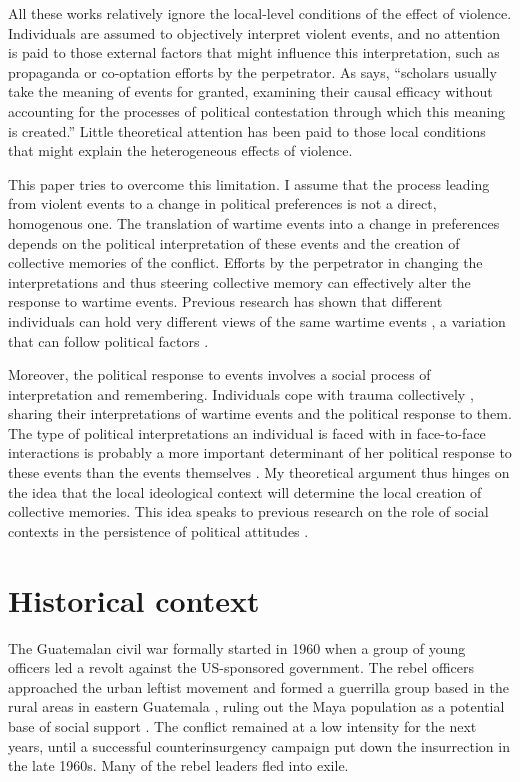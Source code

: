 \documentclass[12pt, notitlepage]{article}
\begin{document}
All these works relatively ignore the local-level conditions of the effect of violence.
Individuals are assumed to objectively interpret violent events, and no attention is paid to those external factors that might influence this interpretation, such as propaganda or co-optation efforts by the perpetrator.
As \citet[1244]{Basta:2018aa} says, ``scholars usually take the meaning of events for granted, examining their causal efficacy without accounting for the processes of political contestation through which this meaning is created.''
Little theoretical attention has been paid to those local conditions that might explain the heterogeneous effects of violence.

This paper tries to overcome this limitation.
I assume that the process leading from violent events to a change in political preferences is not a direct, homogenous one.
The translation of wartime events into a change in preferences depends on the political interpretation of these events and the creation of collective memories of the conflict.
Efforts by the perpetrator in changing the interpretations and thus steering collective memory can effectively alter the response to wartime events.
Previous research has shown that different individuals can hold very different views of the same wartime events \citep{Driscoll:2016aa}, a variation that can follow political factors \citep{Silverman:2019aa}.

Moreover, the political response to events involves a social process of interpretation and remembering.
Individuals cope with trauma collectively \citep{Lyons:1998aa}, sharing their interpretations of wartime events and the political response to them.
The type of political interpretations an individual is faced with in face-to-face interactions is probably a more important determinant of her political response to these events than the events themselves \citep{Dyrstad:2012aa, Molina:2014aa, Glaurdic:2016aa}.
My theoretical argument thus hinges on the idea that the local ideological context will determine the local creation of collective memories.
This idea speaks to previous research on the role of social contexts in the persistence of political attitudes \citep{Wittenberg:2006aa, Tavits:2013aa}.

\section*{Historical context}

The Guatemalan civil war formally started in 1960 when a group of young officers led a revolt against the US-sponsored government.
The rebel officers approached the urban leftist movement and formed a guerrilla group based in the rural areas in eastern Guatemala \citep{Arias:1992aa}, ruling out the Maya population as a potential base of social support \citep{Smith:1990ab}.
The conflict remained at a low intensity for the next years, until a successful counterinsurgency campaign put down the insurrection in the late 1960s.
Many of the rebel leaders fled into exile.
\end{document}
